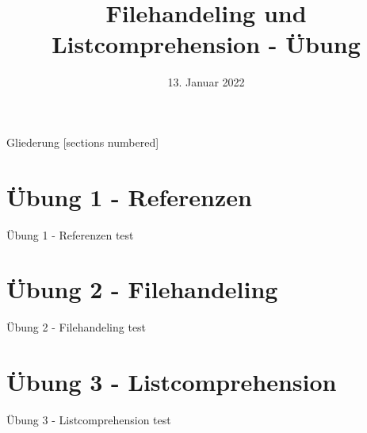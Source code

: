 



\title{Filehandeling und Listcomprehension - Übung}
\date{13. Januar 2022}


\maketitle

\begin{frame}{Gliederung}
	[sections numbered]
	\tableofcontents
\end{frame}

\section{Übung 1 - Referenzen}
\begin{frame}{Übung 1 - Referenzen}
	test
\end{frame}

\section{Übung 2 - Filehandeling}
\begin{frame}{Übung 2 - Filehandeling}
	test
\end{frame}

\section{Übung 3 - Listcomprehension}
\begin{frame}{Übung 3 - Listcomprehension}
	test
\end{frame}


